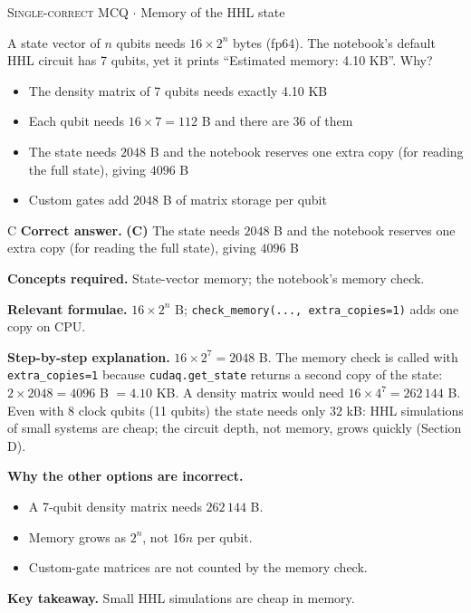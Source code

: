 \documentclass[11pt,a4paper]{article}
\newcommand{\optlabel}[1]{\textbf{(#1)}}
\newcommand{\correctlabel}[1]{\textcolor{okgreen}{\textbf{(#1)}\,\ding{51}}}
\newenvironment{qitem}[1]{\begin{list}{}{\setlength{\leftmargin}{3.3em}\setlength{\labelwidth}{3.1em}%
  \setlength{\labelsep}{0.2em}\setlength{\topsep}{3pt}\setlength{\parsep}{3pt}}\item[\textbf{Q.#1}\hfill]}{\end{list}}
\newcommand{\qsep}{\par\vspace{2pt}{\color{black!15}\hrule}\vspace{4pt}}
\newcommand{\qmeta}[2]{{\footnotesize\color{black!60}\textsc{#1} \;$\cdot$\; #2}\par}
\begin{document}
\begin{qitem}{33}
\qmeta{Single-correct MCQ}{Memory of the HHL state}
A state vector of $n$ qubits needs $16\times2^n$ bytes (fp64). The notebook's default HHL circuit has 7 qubits, yet it prints ``Estimated memory: 4.10 KB''. Why?
\begin{itemize}[leftmargin=2.6em, labelsep=0.4em, itemsep=2pt, topsep=3pt]
\item[\optlabel{A}] The density matrix of 7 qubits needs exactly 4.10 KB
\item[\optlabel{B}] Each qubit needs $16 \times 7 = 112$ B and there are 36 of them
\item[\correctlabel{C}] The state needs $2048$ B and the notebook reserves one extra copy (for reading the full state), giving $4096$ B
\item[\optlabel{D}] Custom gates add $2048$ B of matrix storage per qubit
\end{itemize}
\end{qitem}
\begin{solbox}{C}
\textbf{\color{brand}Correct answer.} \textcolor{okgreen}{\textbf{(C)}} The state needs $2048$ B and the notebook reserves one extra copy (for reading the full state), giving $4096$ B

\textbf{\color{brand}Concepts required.} State-vector memory; the notebook's memory check.

\textbf{\color{brand}Relevant formulae.} $16\times2^n$ B; \texttt{check\_memory(..., extra\_copies=1)} adds one copy on CPU.

\textbf{\color{brand}Step-by-step explanation.} $16\times2^7 = 2048$ B. The memory check is called with \texttt{extra\_copies=1} because \texttt{cudaq.get\_state} returns a second copy of the state: $2\times2048 = 4096$ B $= 4.10$ KB.
A density matrix would need $16\times4^7 = 262\,144$ B. Even with 8 clock qubits (11 qubits) the state needs only $32$ kB: HHL simulations of small systems are cheap;
the circuit depth, not memory, grows quickly (Section D).

\textbf{\color{brand}Why the other options are incorrect.}
\begin{itemize}[leftmargin=2.4em, itemsep=1pt, topsep=2pt]
\item[\textbf{(A)}] A 7-qubit density matrix needs $262\,144$ B.
\item[\textbf{(B)}] Memory grows as $2^n$, not $16n$ per qubit.
\item[\textbf{(D)}] Custom-gate matrices are not counted by the memory check.
\end{itemize}
\textbf{\color{brand}Key takeaway.} Small HHL simulations are cheap in memory.
\end{solbox}
\qsep
\end{document}
